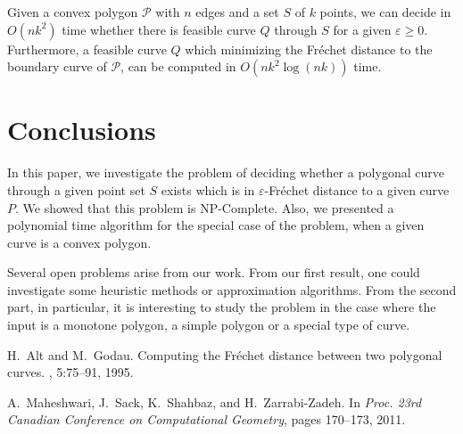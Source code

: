 \documentclass[a4paper,UKenglish]{lipics}
\newcommand{\gee}{\geqslant}
\newcommand{\eps}{\varepsilon}
\newcommand{\Pol}{{\mathscr P}}
\newcommand{\Frechet}{Fr\'echet }
\newcommand{\pset}{S}
\begin{document}
\begin{theorem} \label{thm:main}
	Given a convex polygon $\Pol$ with $n$ edges and a set $S$ of $k$ points, 
	we can decide in $O(nk^2)$ time whether there is feasible curve $Q$ through $S$ 
	for a given $\eps \gee 0$. Furthermore, a feasible curve $Q$ which minimizing the 
\Frechet distance to the boundary curve of $\Pol$, can be computed in $O(nk^2 \log (nk))$ time.

\end{theorem}



\section{Conclusions}
\label{sec:conc}
In this paper, we investigate the problem of 
 deciding whether a polygonal curve through a given point set
$\pset$ exists which is in $\eps$-\Frechet distance 
to a given curve $P$. We showed that this problem
is NP-Complete. Also, we presented a polynomial 
time algorithm for the special case of the 
problem, when a given curve is a convex polygon. 

Several open problems arise from our work.
From our first result, 
one could investigate some heuristic methods or 
approximation algorithms.
From the second part, in particular, it is interesting 
to study the  problem in the case 
where the input is a monotone polygon, a simple polygon
or a special type of curve.






















\nocite{Simpson}



\begin{thebibliography}{50}
H.~Alt and M.~Godau.
\newblock Computing the {Fr{\'e}chet} distance between two polygonal curves.
, 5:75--91, 1995.


A.~Maheshwari, J.~Sack, K.~Shahbaz, and H.~Zarrabi-Zadeh.
\newblock In {\em Proc. 23rd Canadian Conference on Computational Geometry}, pages 170--173,
  2011.

\end{thebibliography}
\end{document}
